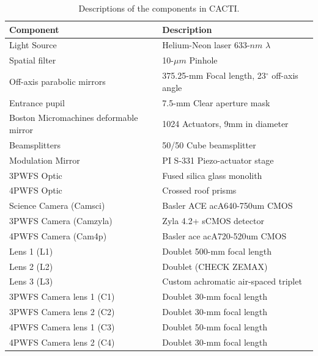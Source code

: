 \begin{table}
	\begin{center}
		\begin{tabular}{ | l| l | }
			\hline
			\textbf{Component}& \textbf{Description}\\ \hline
			Light Source & Helium-Neon laser 633-$nm$ $\lambda$\\ \hline
			Spatial filter & 10-$\mu m$ Pinhole \\ \hline
			Off-axis parabolic mirrors & 375.25-mm Focal length, 23$^{\circ}$ off-axis angle \\ \hline
            Entrance pupil & 7.5-mm Clear aperture mask \\ \hline
            Boston Micromachines deformable mirror & 1024 Actuators, 9mm in diameter \\ \hline
            Beamsplitters & 50/50 Cube beamsplitter \\ \hline
            Modulation Mirror &  PI S-331 Piezo-actuator stage \\ \hline
            3PWFS Optic & Fused silica glass monolith \\ \hline
            4PWFS Optic & Crossed roof prisms \\ \hline
            Science Camera (Camsci) & Basler ACE acA640-750um CMOS\\ \hline
            3PWFS Camera (Camzyla) & Zyla 4.2+ sCMOS detector \\ \hline
            4PWFS Camera (Cam4p) & Basler ace acA720-520um CMOS \\ \hline
            Lens 1 (L1) & Doublet 500-mm focal length  \\ \hline
            Lens 2 (L2) & Doublet (CHECK ZEMAX)  \\ \hline
            Lens 3 (L3) & Custom achromatic air-spaced triplet  \\ \hline
            3PWFS Camera lens 1 (C1) & Doublet 30-mm focal length \\ \hline
            3PWFS Camera lens 2 (C2) & Doublet 30-mm focal length \\ \hline
            4PWFS Camera lens 1 (C3) & Doublet 50-mm focal length \\ \hline
            4PWFS Camera lens 2 (C4) & Doublet 30-mm focal length \\ \hline
				
			\end{tabular}
		\end{center}
	\caption{Descriptions of the components in CACTI.}
	\label{tab:CACTItable}
\end{table}


